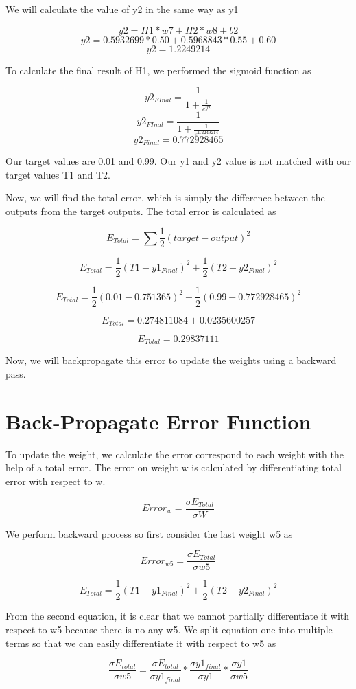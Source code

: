 \documentclass[12pt]{article}
\begin{document}
We will calculate the value of y2 in the same way as y1

\[y2=H1*w7+H2*w8+b2\]
\[y2=0.5932699*0.50+0.5968843*0.55+0.60\]
\[y2=1.2249214\]

To calculate the final result of H1, we performed the sigmoid function as

\[y2_{FInal}=\frac{1}{1+\frac{1}{e^{y2}}}\]
\[y2_{FInal}=\frac{1}{1+\frac{1}{e^{1.2249214}}}\]
\[y2_{Final}=0.772928465\]

Our target values are 0.01 and 0.99. Our y1 and y2 value is not matched with our target values T1 and T2.

Now, we will find the total error, which is simply the difference between the outputs from the target outputs. The total error is calculated as

\[E_{Total}=\sum\frac{1}{2}(target - output)^{2}\]

\[E_{Total}=\frac{1}{2}(T1 - y1_{Final})^{2}+\frac{1}{2}(T2 - y2_{Final})^{2}\]

\[E_{Total}=\frac{1}{2}(0.01 - 0.751365)^{2}+\frac{1}{2}(0.99 - 0.772928465)^{2}\]

\[E_{Total}=0.274811084+0.0235600257\]

\[E_{Total}=0.29837111\]

Now, we will backpropagate this error to update the weights using a backward pass.

\section{Back-Propagate Error Function}
To update the weight, we calculate the error correspond to each weight with the help of a total error. The error on weight w is calculated by differentiating total error with respect to w.

\[Error_{w}=\frac{\sigma E_{Total}}{\sigma W}\]

We perform backward process so first consider the last weight w5 as

\[Error_{w5}=\frac{\sigma E_{Total}}{\sigma w5}\]


\[E_{Total}=\frac{1}{2}(T1 - y1_{Final})^{2}+\frac{1}{2}(T2 - y2_{Final})^{2}\]


From the second equation, it is clear that we cannot partially differentiate it with respect to w5 because there is no any w5. We split equation one into multiple terms so that we can easily differentiate it with respect to w5 as


\[\frac{\sigma E_{total}}{\sigma w5}=\frac{\sigma E_{total}}{\sigma y1_{final}}*\frac{\sigma y1_{final}}{\sigma y1}*\frac{\sigma y1}{\sigma w5}\]
\end{document}

